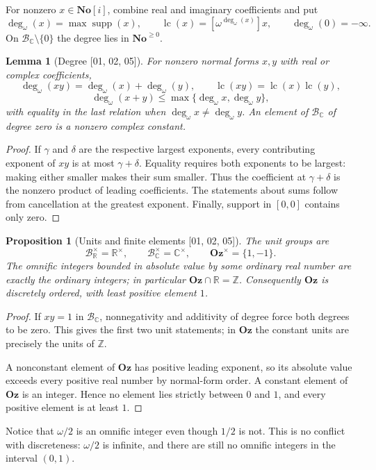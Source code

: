 \documentclass[11pt,oneside]{article}
\numberwithin{equation}{section}
\newtheorem{proposition}[proposition]{Proposition}
\newtheorem{lemma}[lemma]{Lemma}
\theoremstyle{definition}
\theoremstyle{remark}
\newcommand{\No}{\mathbf{No}}
\newcommand{\Oz}{\mathbf{Oz}}
\newcommand{\Z}{\mathbb Z}
\newcommand{\R}{\mathbb R}
\newcommand{\C}{\mathbb C}
\newcommand{\BR}{\mathcal B_{\R}}
\newcommand{\BC}{\mathcal B_{\C}}
\newcommand{\supp}{\operatorname{supp}}
\newcommand{\lc}{\operatorname{lc}}
\newcommand{\ddeg}{\operatorname{deg}_{\omega}}
\newcommand{\src}[1]{\textup{\textsf{\small[#1]}}}
\begin{document}
For nonzero $x\in\No[i]$, combine real and imaginary coefficients and put
\[
 \ddeg(x)=\max\supp(x),\qquad \lc(x)=[\omega^{\ddeg(x)}]x,
 \qquad \ddeg(0)=-\infty.
\]
On $\BC\setminus\{0\}$ the degree lies in $\No^{\geq0}$.

\begin{lemma}[Degree \src{01, 02, 05}]\label{odg:lem:degree}
For nonzero normal forms $x,y$ with real or complex coefficients,
\[
 \ddeg(xy)=\ddeg(x)+\ddeg(y),\qquad
 \lc(xy)=\lc(x)\lc(y),
\]
\[
 \ddeg(x+y)\le\max\{\ddeg x,\ddeg y\},
\]
with equality in the last relation when $\ddeg x\ne\ddeg y$. An element of
$\BC$ of degree zero is a nonzero complex constant.
\end{lemma}
\begin{proof}
If $\gamma$ and $\delta$ are the respective largest exponents, every
contributing exponent of $xy$ is at most $\gamma+\delta$. Equality requires
both exponents to be largest: making either smaller makes their sum smaller.
Thus the coefficient at $\gamma+\delta$ is the nonzero product of leading
coefficients. The statements about sums follow from cancellation at the
greatest exponent. Finally, support in $[0,0]$ contains only zero.
\end{proof}

\begin{proposition}[Units and finite elements \src{01, 02, 05}]\label{odg:prop:units}
The unit groups are
\[
 \BR^\times=\R^\times,\qquad
 \BC^\times=\C^\times,\qquad \Oz^\times=\{1,-1\}.
\]
The omnific integers bounded in absolute value by some ordinary real number
are exactly the ordinary integers; in particular $\Oz\cap\R=\Z$.
Consequently $\Oz$ is discretely ordered, with least positive element $1$.
\end{proposition}
\begin{proof}
If $xy=1$ in $\BC$, nonnegativity and additivity of degree force both
degrees to be zero. This gives the first two unit statements; in $\Oz$ the
constant units are precisely the units of $\Z$.

A nonconstant element of $\Oz$ has positive leading exponent, so its
absolute value exceeds every positive real number by normal-form order.
A constant element of $\Oz$ is an integer. Hence no element lies strictly
between $0$ and $1$, and every positive element is at least $1$.
\end{proof}

Notice that $\omega/2$ is an omnific integer even though $1/2$ is not.
This is no conflict with discreteness: $\omega/2$ is infinite, and
there are still no omnific integers in the interval $(0,1)$.
\end{document}
